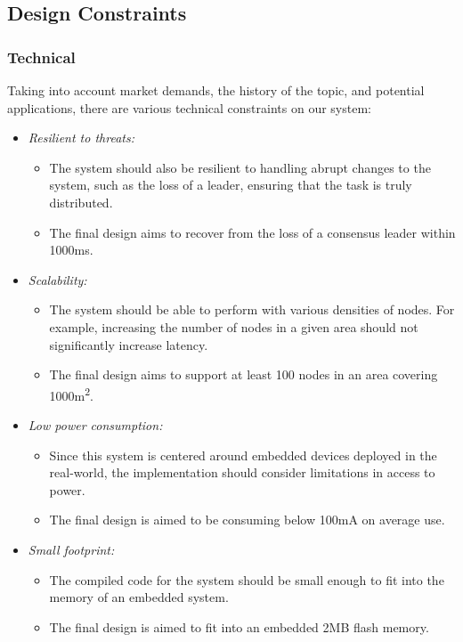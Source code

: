


\newpage
\subsection{Design Constraints}
\subsubsection{Technical}

Taking into account market demands, the history of the topic, and potential applications, there are various technical constraints on our system:

\begin{itemize}
    \item \textit{Resilient to threats:}
    \begin{itemize}
        \item  The system should also be resilient to handling abrupt changes to the system, such as the loss of a leader, ensuring that the task is truly distributed. 
        \item The final design aims to recover from the loss of a consensus leader within 1000\si{\ms}.
    \end{itemize}
    
    \item \textit{Scalability:} 
    \begin{itemize}
        \item The system should be able to perform with various densities of nodes. For example, increasing the number of nodes in a given area should not significantly increase latency. 
        \item The final design aims to support at least 100 nodes in an area covering 1000\si{m^2}.
    \end{itemize}
    
    \item \textit{Low power consumption:}
    \begin{itemize}
        \item Since this system is centered around embedded devices deployed in the real-world, the implementation should consider limitations in access to power. 
        \item The final design is aimed to be consuming below 100\si{mA} on average use.
    \end{itemize}
    
    \item \textit{Small footprint:} 
    \begin{itemize}
        \item The compiled code for the system should be small enough to fit into the memory of an embedded system. 
        \item The final design is aimed to fit into an embedded 2\si{MB} flash memory.
    \end{itemize}
\end{itemize}

